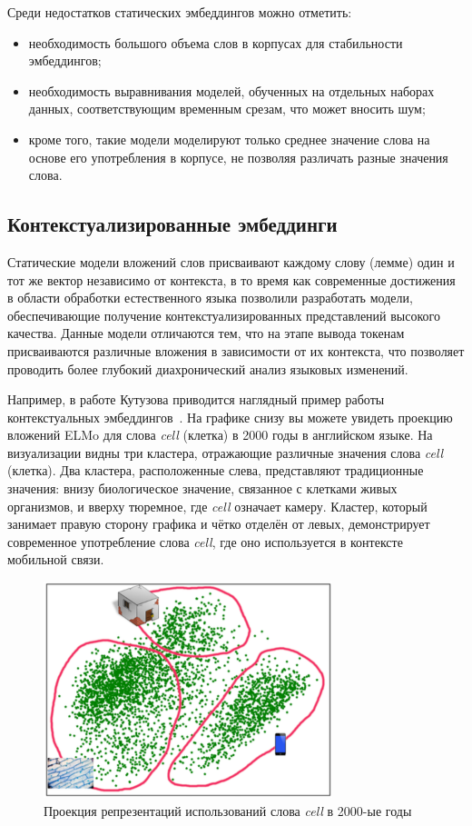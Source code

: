 \documentclass[LI,VKR]{HSEUniversity}
\begin{document}
Среди недостатков статических эмбеддингов можно отметить:
\begin{itemize}
    \item необходимость большого объема слов в корпусах для стабильности эмбеддингов;
    \item необходимость выравнивания моделей, обученных на отдельных наборах данных,
соответствующим временным срезам, что может вносить шум;
    \item кроме того, такие модели моделируют только среднее значение слова на основе его употребления в корпусе,
не позволяя различать разные значения слова.
\end{itemize}

\subsection{Контекстуализированные эмбеддинги}

Статические модели вложений слов присваивают каждому слову (лемме) один и тот же вектор
независимо от контекста, в то время как современные достижения в области обработки
естественного языка позволили разработать модели,
обеспечивающие получение контекстуализированных представлений высокого качества.
Данные модели отличаются тем, что на этапе вывода токенам присваиваются различные вложения
в зависимости от их контекста, что позволяет проводить более глубокий диахронический
анализ языковых изменений.

Например, в работе Кутузова приводится наглядный пример работы
контекстуальных эмбеддингов~\cite{Kutuzov2020Thesis}.
На графике снизу вы можете увидеть проекцию вложений ELMo для слова \textit{cell} (клетка)
в 2000 годы в английском языке.
На визуализации видны три кластера, отражающие различные значения слова \textit{cell} (клетка).
Два кластера, расположенные слева, представляют традиционные значения:
внизу биологическое значение, связанное с клетками живых организмов,
и вверху тюремное, где \textit{cell} означает камеру.
Кластер, который занимает правую сторону графика и чётко отделён от левых,
демонстрирует современное употребление слова \textit{cell},
где оно используется в контексте мобильной связи.

\begin{figure}[H]
	\centering
	\includegraphics[width=0.75\textwidth]{img/theory/cell_projection_2000}
	\caption{Проекция репрезентаций использований слова \textit{cell} в 2000-ые годы}
	\label{fig:Контекстуальные вложения}
\end{figure}
\end{document}
